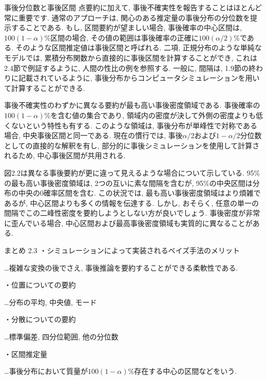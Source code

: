 \documentclass[10pt,dvipdfmx,a4]{beamer}
\begin{document}
\begin{frame}{事後分位数と事後区間}
点要約に加えて, 事後不確実性を報告することはほとんど常に重要です.
通常のアプローチは, 関心のある推定量の事後分布の分位数を提示することである.
もし, 区間要約が望ましい場合, 事後確率の中心区間は, $100(1-\alpha)$\%区間の場合,  その値の範囲は事後確率の正確に$100(\alpha/2)$\%である.
そのような区間推定値は事後区間と呼ばれる.
二項, 正規分布のような単純なモデルでは, 累積分布関数から直接的に事後区間を計算することができ, これは2.4節で例証するように, 人間の性比の例を参照する.
一般に, 間隔は, 1.9節の終わりに記載されているように, 事後分布からコンピュータシミュレーションを用いて計算することができる.

事後不確実性のわずかに異なる要約が最も高い事後密度領域である.
事後確率の$100(1-\alpha)$\%を含む値の集合であり, 領域内の密度が決して外側の密度よりも低くないという特性も有する.
このような領域は, 事後分布が単峰性で対称である場合, 中央事後区間と同一である.
現在の慣行では, 事後$\alpha/2$および$1-\alpha/2$分位数としての直接的な解釈を有し, 部分的に事後シミュレーションを使用して計算されるため, 中心事後区間が共用される.
\end{frame}


\begin{frame}
図2.2は異なる事後要約が更に違って見えるような場合について示している.
95\%の最も高い事後密度領域は, 2つの互いに素な間隔を含むが, 95\%の中央区間は分布の中央の0確率区間を含む.
この状況では, 最も高い事後密度領域はより煩雑であるが, 中心区間よりも多くの情報を伝達する.
しかし, おそらく, 任意の単一の間隔でこの二峰性密度を要約しようとしない方が良いでしょう.
事後密度が非常に歪んでいる場合, 中心区間および最高事後密度領域も実質的に異なることがある.
\end{frame}


\begin{frame}{まとめ 2.3}
・シミュレーションによって実装されるベイズ手法のメリット

…複雑な変換の後でさえ, 事後推論を要約することができる柔軟性である.

・位置についての要約

…分布の平均, 中央値, モード

・分散についての要約

…標準偏差, 四分位範囲, 他の分位数

・区間推定量

…事後分布において質量が$100(1-\alpha)\%$存在する中心の区間などをいう.
\end{frame}
\end{document}
